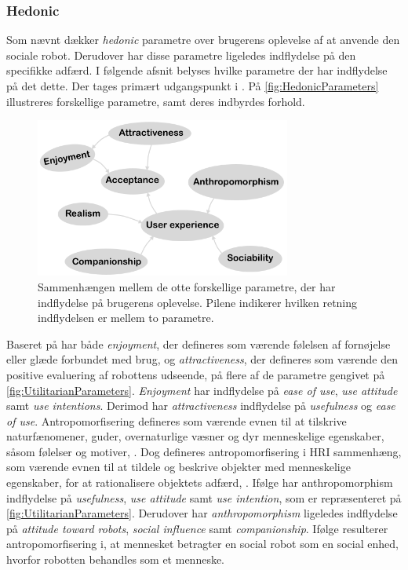 \subsubsection*{Hedonic}
\label{InteraktionSocialeRobotterParametreHedonic}
%
Som nævnt dækker \textit{hedonic} parametre over brugerens oplevelse af at anvende den sociale robot. Derudover har disse parametre ligeledes indflydelse på den specifikke adfærd. I følgende afsnit belyses hvilke parametre der har indflydelse på det dette. Der tages primært udgangspunkt i \textcite[ss. 1477-1478]{PDF:SharingALifeHarvey}. På \autoref{fig:HedonicParameters} illustreres forskellige parametre, samt deres indbyrdes forhold.
%
\begin{figure}[H]
\centering
\includegraphics[width = 0.75\textwidth]{Figure/HedonicParameters} 
\caption{Sammenhængen mellem de otte forskellige parametre, der har indflydelse på brugerens oplevelse. Pilene indikerer hvilken retning indflydelsen er mellem to parametre.}
\label{fig:HedonicParameters}
\end{figure}
\noindent 
%
Baseret på \textcite[s. 1477]{PDF:ExploringInfluencingVariable} har både \textit{enjoyment}, der defineres som værende følelsen af fornøjelse eller glæde forbundet med brug, og \textit{attractiveness}, der defineres som værende den positive evaluering af robottens udseende, på flere af de parametre gengivet på \autoref{fig:UtilitarianParameters}. \textit{Enjoyment} har indflydelse på \textit{ease of use}, \textit{use attitude} samt \textit{use intentions}. Derimod har \textit{attractiveness} indflydelse på \textit{usefulness} og \textit{ease of use}. \blankline 
%
Antropomorfisering defineres som værende evnen til at tilskrive naturfænomener, guder, overnaturlige væsner og dyr menneskelige egenskaber, såsom følelser og motiver, \parencite{WEB:DefAntropomorisering}. Dog defineres antropomorfisering i HRI sammenhæng, som værende evnen til at tildele og beskrive objekter med menneskelige egenskaber, for at rationalisere objektets adfærd, \parencite[s. 1478]{PDF:ExploringInfluencingVariable}. Ifølge \textcite[s. 1478]{PDF:ExploringInfluencingVariable} har anthropomorphism indflydelse på \textit{usefulness}, \textit{use attitude} samt \textit{use intention}, som er repræsenteret på \autoref{fig:UtilitarianParameters}. Derudover har \textit{anthropomorphism} ligeledes indflydelse på \textit{attitude toward robots}, \textit{social influence} samt \textit{companionship}. Ifølge \textcite[s. 19]{PDF:CloseButNotStuck} resulterer antropomorfisering i, at mennesket betragter en social robot som en social enhed, hvorfor robotten behandles som et menneske.

